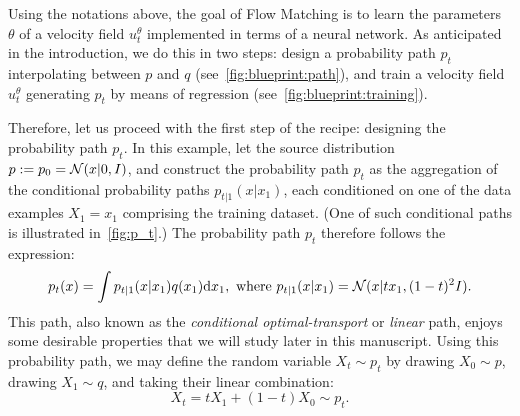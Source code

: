 \documentclass{fairmeta}
\numberwithin{equation}{section}
\begin{document}
Using the notations above, the goal of Flow Matching is to learn the parameters $\theta$ of a velocity field $u^\theta_t$ implemented in terms of a neural network.
As anticipated in the introduction, we do this in two steps: design a probability path $p_t$ interpolating between $p$ and $q$ (see~\cref{fig:blueprint:path}), and train a velocity field $u^\theta_t$ generating $p_t$ by means of regression (see~\cref{fig:blueprint:training}).


Therefore, let us proceed with the first step of the recipe: designing the probability path $p_t$.
In this example, let the source distribution $p := p_0 = {\mathcal{N}}(x | 0, I)$, and construct the probability path $p_t$ as the aggregation of the conditional probability paths $p_{t|1}(x | x_1)$, each conditioned on one of the data examples $X_1=x_1$ comprising the training dataset.
(One of such conditional paths is illustrated in~\cref{fig:p_t}.)
The probability path $p_t$ therefore follows the expression:
\begin{equation}\label{e:condot_path}
    p_t(x) = \int p_{t|1}(x|x_1)q(x_1)\mathrm{d} x_1, \text{ where } p_{t|1}(x|x_1)={\mathcal{N}}(x | t x_1, (1-t)^2I).
\end{equation}
This path, also known as the \emph{conditional optimal-transport} or \emph{linear} path, enjoys some desirable properties that we will study later in this manuscript.
Using this probability path, we may define the random variable $X_t \sim p_t$ by drawing $X_0 \sim p$, drawing $X_1 \sim q$, and taking their linear combination:
\begin{equation}\label{e:quick_tour_X_t}
    X_t = t X_1 + (1-t) X_0 \sim p_t.
\end{equation} 
\end{document}
